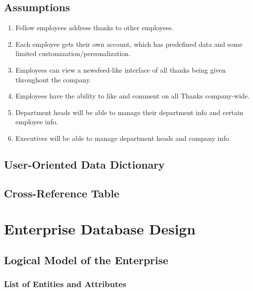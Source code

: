 \documentclass[11pt]{report}
\begin{document}
\section{Assumptions}
\begin{enumerate}
\item Fellow employees address thanks to other employees.
\item Each employee gets their own account, which has predefined data and some limited customization/personalization.
\item Employees can view a newsfeed-like interface of all thanks being given throughout the company.
\item Employees have the ability to like and comment on all Thanks company-wide.
\item Department heads will be able to manage their department info and certain employee info.
\item Executives will be able to manage department heads and company info.
\end{enumerate}
\clearpage
\section{User-Oriented Data Dictionary}
\section{Cross-Reference Table}

\chapter{Enterprise Database Design}

\section{Logical Model of the Enterprise}
\subsection{List of Entities and Attributes}
\end{document}
